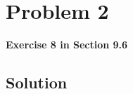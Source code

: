 
\begingroup
\allowdisplaybreaks

\newpage
\section{Problem 2}

\textbf{Exercise 8 in Section 9.6}

\subsection{Solution}

